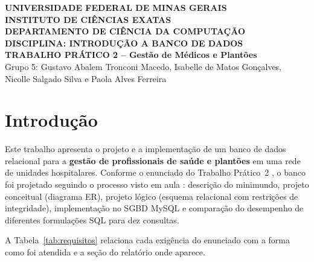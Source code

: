 \documentclass[10pt,a4paper]{article}
\begin{document}
\begin{center}
\textbf{UNIVERSIDADE FEDERAL DE MINAS GERAIS}\\
\textbf{INSTITUTO DE CIÊNCIAS EXATAS}\\
\textbf{DEPARTAMENTO DE CIÊNCIA DA COMPUTAÇÃO}\\
\textbf{DISCIPLINA: INTRODUÇÃO A BANCO DE DADOS}\\[6pt]
\textbf{TRABALHO PRÁTICO 2 -- Gestão de Médicos e Plantões}\\[6pt]
Grupo 5: Gustavo Abalem Tronconi Macedo, Isabelle de Matos Gonçalves,\\
Nicolle Salgado Silva e Paola Alves Ferreira
\end{center}

\section{Introdução}\label{sec:intro}

Este trabalho apresenta o projeto e a implementação de um banco de dados relacional para a \textbf{gestão de profissionais de saúde e plantões} em uma rede de unidades hospitalares. Conforme o enunciado do Trabalho Prático~2 \cite{enunciado}, o banco foi projetado seguindo o processo visto em aula \cite{material,elmasri}: descrição do minimundo, projeto conceitual (diagrama ER), projeto lógico (esquema relacional com restrições de integridade), implementação no SGBD MySQL e comparação do desempenho de diferentes formulações SQL para dez consultas.

A Tabela~\ref{tab:requisitos} relaciona cada exigência do enunciado com a forma como foi atendida e a seção do relatório onde aparece.
\end{document}
